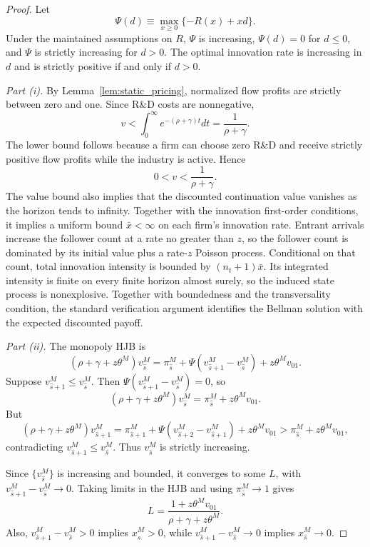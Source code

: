 \documentclass[12pt]{article}
\begin{document}
\begin{proof}
Let
\[\Psi(d)\equiv \max_{x\geq 0}\{-R(x)+xd\}. \]
Under the maintained assumptions on \(R\), \(\Psi\) is increasing, \(\Psi(d)=0\) for \(d\leq 0\), and \(\Psi\) is strictly increasing for \(d>0\). The optimal innovation rate is increasing in \(d\) and is strictly positive if and only if \(d>0\).

\medskip

\noindent\textit{Part (i).}
By Lemma~\ref{lem:static_pricing}, normalized flow profits are strictly between zero and one. Since R\&D costs are nonnegative,
\[ v<\int_0^\infty e^{-(\rho+\gamma)t}dt=\frac{1}{\rho+\gamma}. \]
The lower bound follows because a firm can choose zero R\&D and receive strictly positive flow profits while the industry is active. Hence
\[0<v<\frac{1}{\rho+\gamma}.\]
The value bound also implies that the discounted continuation value vanishes as the horizon tends to infinity. Together with the innovation first-order conditions, it implies a uniform bound \(\bar x<\infty\) on each firm's innovation rate. Entrant arrivals increase the follower count at a rate no greater than \(z\), so the follower count is dominated by its initial value plus a rate-\(z\) Poisson process. Conditional on that count, total innovation intensity is bounded by \((n_t+1)\bar x\). Its integrated intensity is finite on every finite horizon almost surely, so the induced state process is nonexplosive. Together with boundedness and the transversality condition, the standard verification argument identifies the Bellman solution with the expected discounted payoff.

\medskip

\noindent\textit{Part (ii).}
The monopoly HJB is
\[(\rho+\gamma+z\theta^M)v^M_{\hat{s}}=
\pi^M_{\hat{s}}+\Psi(v^M_{\hat{s}+1}-v^M_{\hat{s}})+z\theta^Mv_{01}.\]
Suppose \(v^M_{\hat{s}+1}\leq v^M_{\hat{s}}\). Then \(\Psi(v^M_{\hat{s}+1}-v^M_{\hat{s}})=0\), so
\[(\rho+\gamma+z\theta^M)v^M_{\hat{s}}=\pi^M_{\hat{s}}+z\theta^Mv_{01}.\]
But
\[(\rho+\gamma+z\theta^M)v^M_{\hat{s}+1}=
\pi^M_{\hat{s}+1}+\Psi(v^M_{\hat{s}+2}-v^M_{\hat{s}+1})+z\theta^Mv_{01}
>\pi^M_{\hat{s}}+z\theta^Mv_{01},\]
contradicting \(v^M_{\hat{s}+1}\leq v^M_{\hat{s}}\). Thus \(v^M_{\hat{s}}\) is strictly increasing.

Since \(\{v^M_{\hat{s}}\}\) is increasing and bounded, it converges to some \(L\), with \(v^M_{\hat{s}+1}-v^M_{\hat{s}}\to 0\). Taking limits in the HJB and using \(\pi^M_{\hat{s}}\to 1\) gives
\[L=\frac{1+z\theta^Mv_{01}}{\rho+\gamma+z\theta^M}.\]
Also, \(v^M_{\hat{s}+1}-v^M_{\hat{s}}>0\) implies \(x^M_{\hat{s}}>0\), while \(v^M_{\hat{s}+1}-v^M_{\hat{s}}\to 0\) implies \(x^M_{\hat{s}}\to 0\).


\end{proof}
\end{document}
